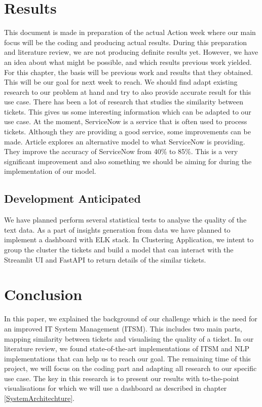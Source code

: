 \documentclass[a4paper,12pt]{report}
\begin{document}
    \chapter{Results}
    This document is made in preparation of the actual Action week where our main focus will be the coding and producing actual results. During this preparation and literature review, we are not producing definite results yet. However, we have an idea about what might be possible, and which results previous work yielded. For this chapter, the basis will be previous work and results that they obtained. This will be our goal for next week to reach. We should find adapt existing research to our problem at hand and try to also provide accurate result for this use case.
    \newline\newline
    There has been a lot of research that studies the similarity between tickets. This gives us some interesting information which can be adapted to our use case. At the moment, ServiceNow is a service that is often used to process tickets. Although they are providing a good service, some improvements can be made. Article\cite{Garrett2020} explores an alternative model to what ServiceNow is providing. They improve the accuracy of ServiceNow from 40\% to 85\%. This is a very significant improvement and also something we should be aiming for during the implementation of our model.

    \section{Development Anticipated}
    We have planned perform several statistical tests to analyse the quality of the text data.
    As a part of insights generation from data we have planned to implement a dashboard with ELK stack. In Clustering Application, we intent to group the cluster the tickets and build a model that can interact with the Streamlit UI and FastAPI to return details of the similar tickets.

    
    \chapter{Conclusion}
    In this paper, we explained the background of our challenge which is the need for an improved IT System Management (ITSM). This includes two main parts, mapping similarity between tickets and visualising the quality of a ticket. In our literature review, we found state-of-the-art implementations of ITSM and NLP implementations that can help us to reach our goal. The remaining time of this project, we will focus on the coding part and adapting all research to our specific use case. The key in this research is to present our results with to-the-point visualisations for which we will use a dashboard as described in chapter \vref{SystemArchitechture}.
\end{document}
